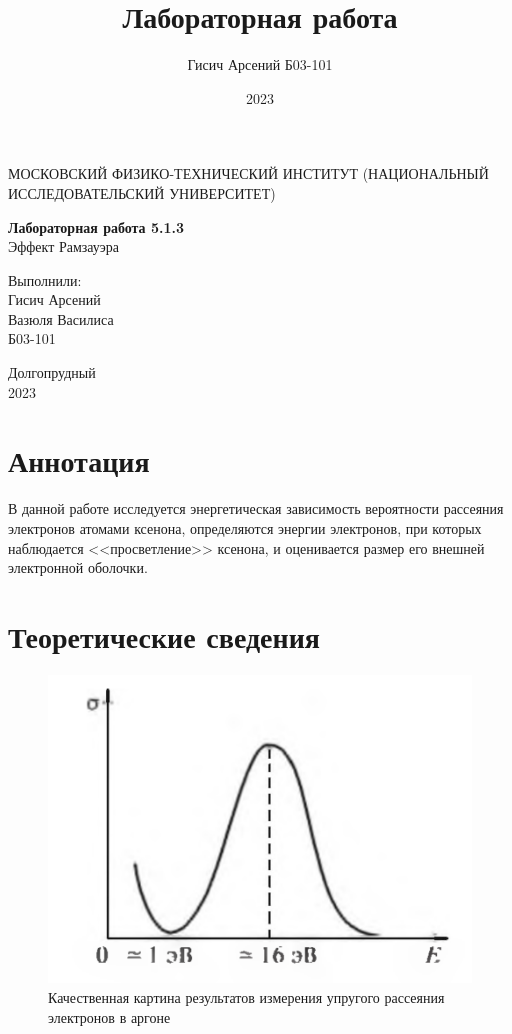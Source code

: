 \documentclass[a4paper, 12pt]{article}
\title{Лабораторная работа}
\author{Гисич Арсений Б03-101}
\date{2023}
\begin{document}
	\begin{center}
		{\large МОСКОВСКИЙ ФИЗИКО-ТЕХНИЧЕСКИЙ ИНСТИТУТ (НАЦИОНАЛЬНЫЙ ИССЛЕДОВАТЕЛЬСКИЙ УНИВЕРСИТЕТ)}
	\end{center}
	\vspace{5 cm}
	{\Large
		\begin{center}
			{\bf Лабораторная работа 5.1.3}\\[0.2 cm]
			Эффект Рамзауэра
		\end{center}
	}
	\vspace{4 cm}
	\begin{flushright}
		{\Large Выполнили: \\
			\vspace{0.2 cm}
			Гисич Арсений \\
            Вазюля Василиса \\ 
			\vspace{0.2 cm}
			Б03-101 \\}
	\end{flushright}
	\vspace{8 cm}
	\begin{center}
		Долгопрудный\\[0.1 cm]
		2023
	\end{center}
\thispagestyle{empty}

\section{Аннотация}

В данной работе исследуется энергетическая зависимость вероятности рассеяния электронов атомами ксенона, определяются энергии электронов, при которых наблюдается <<просветление>> ксенона, и оценивается размер его внешней электронной оболочки.

\section{Теоретические сведения}

\begin{figure}
	\includegraphics[width=1.0\linewidth]{Screenshot_1}
	\caption{Качественная картина результатов измерения упругого рассеяния электронов в аргоне}
	\label{fig:screenshot1}
\end{figure}
\end{document}
